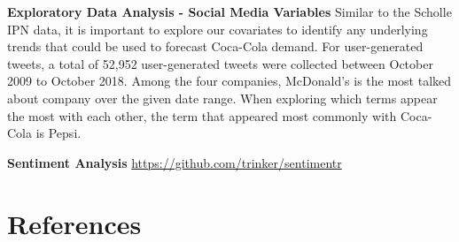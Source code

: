 \documentclass[12pt,oneside]{chicagocapstone}
\begin{document}
\textbf{Exploratory Data Analysis - Social Media Variables}
Similar to the Scholle IPN data, it is important to explore our covariates to identify any underlying trends that could be used to forecast Coca-Cola demand. For user-generated tweets, a total of 52,952 user-generated tweets were collected between October 2009 to October 2018. Among the four companies, McDonald's is the most talked about company over the given date range. When exploring which terms appear the most with each other, the term that appeared most commonly with Coca-Cola is Pepsi.

\textbf{Sentiment Analysis}
\url{https://github.com/trinker/sentimentr}

\backmatter

\hypertarget{references}{%
\chapter*{References}\label{references}}


\noindent

\setlength{\parindent}{-0.20in}
\setlength{\leftskip}{0.20in}
\setlength{\parskip}{8pt}


\end{document}
